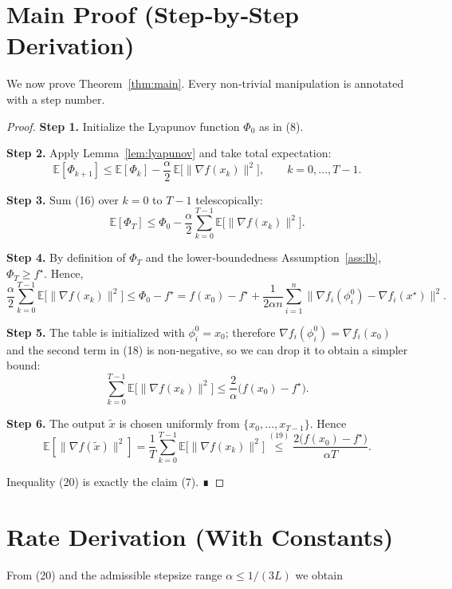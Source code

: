 \documentclass{article}
\begin{document}
\section*{Main Proof (Step‑by‑Step Derivation)}
We now prove Theorem~\ref{thm:main}. Every non‑trivial manipulation is
annotated with a step number.

\begin{proof}
\textbf{Step 1.}  Initialize the Lyapunov function $\Phi_0$ as in (8).  

\textbf{Step 2.}  Apply Lemma~\ref{lem:lyapunov} and take total expectation:
\[
\mathbb{E}[\Phi_{k+1}]\le \mathbb{E}[\Phi_k]-\frac{\alpha}{2}\,
\mathbb{E}\big[\|\nabla f(x_k)\|^{2}\big],\qquad k=0,\dots ,T-1.
\tag{16}
\]

\textbf{Step 3.}  Sum (16) over $k=0$ to $T-1$ telescopically:
\[
\mathbb{E}[\Phi_T]\le \Phi_0-\frac{\alpha}{2}
\sum_{k=0}^{T-1}\mathbb{E}\big[\|\nabla f(x_k)\|^{2}\big].
\tag{17}
\]

\textbf{Step 4.}  By definition of $\Phi_T$ and the lower‑boundedness
Assumption~\ref{ass:lb}, $\Phi_T\ge f^{\star}$. Hence,
\[
\frac{\alpha}{2}\sum_{k=0}^{T-1}\mathbb{E}\big[\|\nabla f(x_k)\|^{2}\big]
\le \Phi_0-f^{\star}
 = f(x_0)-f^{\star}
   +\frac{1}{2\alpha n}\sum_{i=1}^{n}
      \big\|\nabla f_i(\phi_i^0)-\nabla f_i(x^{\star})\big\|^{2}.
\tag{18}
\]

\textbf{Step 5.}  The table is initialized with $\phi_i^0=x_0$;
therefore $\nabla f_i(\phi_i^0)=\nabla f_i(x_0)$ and the second term in (18)
is non‑negative, so we can drop it to obtain a simpler bound:
\[
\sum_{k=0}^{T-1}\mathbb{E}\big[\|\nabla f(x_k)\|^{2}\big]
\le \frac{2}{\alpha}\big(f(x_0)-f^{\star}\big).
\tag{19}
\]

\textbf{Step 6.}  The output $\tilde x$ is chosen uniformly from
$\{x_0,\dots ,x_{T-1}\}$. Hence
\[
\mathbb{E}\!\left[\|\nabla f(\tilde x)\|^{2}\right]
 =\frac{1}{T}\sum_{k=0}^{T-1}\mathbb{E}\big[\|\nabla f(x_k)\|^{2}\big]
 \stackrel{(19)}{\le}
 \frac{2\big(f(x_0)-f^{\star}\big)}{\alpha T}.
\tag{20}
\]

Inequality (20) is exactly the claim (7). ∎
\end{proof}

\section*{Rate Derivation (With Constants)}
From (20) and the admissible stepsize range $\alpha\le 1/(3L)$ we obtain
\end{document}
